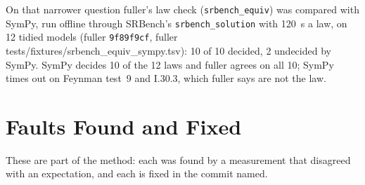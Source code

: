 \documentclass[sigconf,nonacm]{acmart}
\newcommand{\src}[1]{{\small\ttfamily #1}}
\begin{document}
On that narrower question fuller's law check (\texttt{srbench\_equiv}) was
compared with SymPy, run offline through SRBench's \texttt{srbench\_solution}
with 120~s a law, on 12 tidied models (fuller \texttt{9f89f9cf},
\src{fuller tests/\allowbreak{}fixtures/\allowbreak{}srbench\_\allowbreak{}equiv\_\allowbreak{}sympy.\allowbreak{}tsv}): 10 of 10
decided, 2 undecided by SymPy. SymPy decides 10 of the 12 laws and fuller agrees
on all 10; SymPy times out on Feynman test~9 and I.30.3, which fuller says are
not the law.

\section{Faults Found and Fixed}
\label{sec:faults}

These are part of the method: each was found by a measurement that disagreed
with an expectation, and each is fixed in the commit named.
\end{document}
